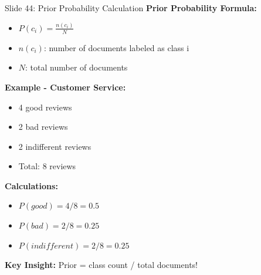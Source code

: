 \documentclass[8pt]{beamer}
\begin{document}
	\begin{frame}{Slide 44: Prior Probability Calculation}
		\fontsize{6.5}{7.5}\selectfont
		\textbf{Prior Probability Formula:}
		\begin{itemize}
			\item $P(c_i) = \frac{n(c_i)}{N}$
			\item $n(c_i)$: number of documents labeled as class i
			\item $N$: total number of documents
		\end{itemize}
		
		\vspace{0.1cm}
		\textbf{Example - Customer Service:}
		\begin{itemize}
			\item 4 good reviews
			\item 2 bad reviews
			\item 2 indifferent reviews
			\item Total: 8 reviews
		\end{itemize}
		
		\vspace{0.1cm}
		\textbf{Calculations:}
		\begin{itemize}
			\item $P(good) = 4/8 = 0.5$
			\item $P(bad) = 2/8 = 0.25$
			\item $P(indifferent) = 2/8 = 0.25$
		\end{itemize}
		
		\textcolor{myblue}{\textbf{Key Insight:}} Prior = class count / total documents!
	\end{frame}
	
\end{document}
